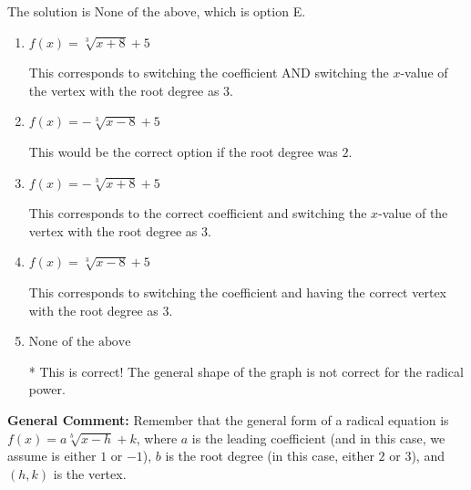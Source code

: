 \documentclass{extbook}[14pt]
\begin{document}
\begin{enumerate}
{The solution is \( \text{None of the above} \), which is option E.\begin{enumerate}[label=\Alph*.]
\item \( f(x) = \sqrt[3]{x + 8} + 5 \)

This corresponds to switching the coefficient AND switching the $x$-value of the vertex with the root degree as $3$.
\item \( f(x) = - \sqrt[3]{x - 8} + 5 \)

This would be the correct option if the root degree was $2$.
\item \( f(x) = - \sqrt[3]{x + 8} + 5 \)

This corresponds to the correct coefficient and switching the $x$-value of the vertex with the root degree as $3$.
\item \( f(x) = \sqrt[3]{x - 8} + 5 \)

This corresponds to switching the coefficient and having the correct vertex with the root degree as $3$.
\item \( \text{None of the above} \)

* This is correct! The general shape of the graph is not correct for the radical power.
\end{enumerate}

\textbf{General Comment:} Remember that the general form of a radical equation is $ f(x) = a \sqrt[b]{x - h} + k$, where $a$ is the leading coefficient (and in this case, we assume is either $1$ or $-1$), $b$ is the root degree (in this case, either $2$ or $3$), and $(h, k)$ is the vertex.
}
\end{enumerate}
\end{document}
